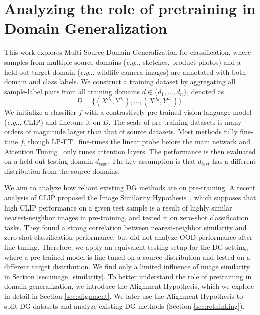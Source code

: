\documentclass{article} %
\makeatletter
\DeclareRobustCommand\onedot{\futurelet\@let@token\@onedot}
\def\@onedot{\ifx\@let@token.\else.\null\fi\xspace}
\def\eg{\emph{e.g}\onedot} \def\Eg{\emph{E.g}\onedot}
\makeatother
\begin{document}
  

\vspace{-8pt}
\section{Analyzing the role of pretraining in Domain Generalization }
\label{sec:analyzing}

This work explores Multi-Source Domain Generalization for classification, where samples from multiple source domains (\eg, sketches, product photos) and a held-out target domain (\eg, wildlife camera images) are annotated with both domain and class labels.  We construct a training dataset by aggregating all sample-label pairs from all training domains \( d \in \{d_1, \ldots, d_n\} \), denoted as 
\[ D = \{(X^{d_1}, Y^{d_1}), \ldots, (X^{d_n}, Y^{d_n})\}. \]
We initialize a classifier \( f \) with a  contrastively pre-trained vision-language model (\eg, CLIP) and finetune it on \( D \). The scale of pre-training datasets is many orders of magnitude larger than that of source datasets. Most methods fully fine-tune   \( f \), though LP-FT~\citep{kumar2021fine} fine-tunes the linear probe before the main network and Attention Tuning~\citep{teterwak2023erm++,touvron2022three} only tunes attention layers. The performance is then evaluated on a held-out testing domain \( d_{\text{test}} \). The key assumption is that $d_{test}$ has a different distribution from the source domains. 


We aim to analyze how reliant existing DG methods are on pre-training. A recent analysis of CLIP proposed the Image Similarity Hypothesis~\citep{mayilvahanan2024does}, which supposes that high CLIP performance on a given test sample is a result of highly similar  nearest-neighbor images in  pre-training, and tested it on zero-shot classification tasks. They found a strong correlation between nearest-neighbor similarity and zero-shot classification performance, but did not analyze OOD performance after fine-tuning. Therefore, we apply an equivalent testing setup for the DG setting, where a pre-trained model is fine-tuned on a source distribution and tested on a different target distribution. We find only a limited influence of image similarity in Section \ref{sec:image_similarity}. To better understand the role of pretraining in domain generalization, we introduce the Alignment Hypothesis, which we explore in detail in Section \ref{sec:alignment}. We later use the Alignment Hypothesis to split DG datasets and analyze existing DG methods (Section \ref{sec:rethinking}). 
\end{document}
